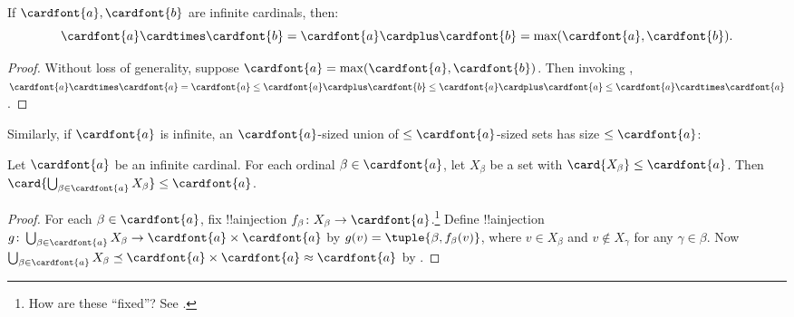 \documentclass[../../../include/open-logic-section]{subfiles}
\begin{document}
\begin{thm}
If $\cardfont{a}, \cardfont{b}$ are infinite cardinals, then:
\[
	\cardfont{a}
\cardtimes \cardfont{b} = \cardfont{a} \cardplus \cardfont{b} =
\text{max}(\cardfont{a}, \cardfont{b}).
\]
\end{thm}

\begin{proof}
Without loss of generality, suppose $\cardfont{a} = \max(\cardfont{a},
\cardfont{b})$. Then invoking ,
$\cardfont{a}\cardtimes\cardfont{a} = \cardfont{a} \leq \cardfont{a}
\cardplus \cardfont{b} \leq \cardfont{a} \cardplus \cardfont{a} \leq
\cardfont{a} \cardtimes \cardfont{a}$. \end{proof}\noindent Similarly,
if $\cardfont{a}$ is infinite, an $\cardfont{a}$-sized union of
$\leq\cardfont{a}$-sized sets has size $\leq\cardfont{a}$:

\begin{prop}
Let $\cardfont{a}$ be an infinite cardinal. For each ordinal $\beta
\in \cardfont{a}$, let $X_\beta$ be a set with $\card{X_\beta} \leq
\cardfont{a}$. Then $\card{\bigcup_{\beta \in \cardfont{a}} X_\beta}
\leq \cardfont{a}$.
\end{prop}

\begin{proof}
For each $\beta \in \cardfont{a}$, fix !!a{injection} $f_\beta \colon
X_\beta \to \cardfont{a}$.\footnote{How are these ``fixed''? See .} Define !!a{injection} $g \colon
\bigcup_{\beta \in \cardfont{a}} X_\beta \to \cardfont{a} \times
\cardfont{a}$ by $g(v) = \tuple{\beta, f_\beta(v)}$, where $v \in
X_\beta$ and $v \notin X_\gamma$ for any $\gamma \in \beta$. Now
$\bigcup_{\beta \in \cardfont{a}} X_\beta \preceq \cardfont{a} \times
\cardfont{a} \approx \cardfont{a}$ by .
\end{proof}
\end{document}
